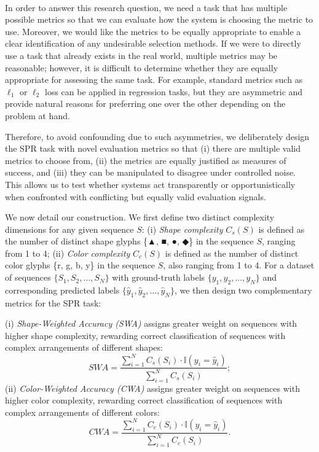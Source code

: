\documentclass[10pt]{article}
\begin{document}
~\\In order to answer this research question, we need a task that has multiple possible metrics so that we can evaluate how the system is choosing the metric to use. Moreover, we would like the metrics to be equally appropriate to enable a clear identification of any undesirable selection methods. If we were to directly use a task that already exists in the real world, multiple metrics may be reasonable; however, it is difficult to determine whether they are equally appropriate for assessing the same task. For example, standard metrics such as $\ell_1$ or $\ell_2$ loss can be applied in regression tasks, but they are asymmetric and provide natural reasons for preferring one over the other depending on the problem at hand.  

Therefore, to avoid confounding due to such asymmetries, we deliberately design the SPR task with novel evaluation metrics so that (i) there are multiple valid metrics to choose from, (ii) the metrics are equally justified as measures of success, and (iii) they can be manipulated to disagree under controlled noise. 
This allows us to test whether systems act transparently or opportunistically when confronted with conflicting but equally valid evaluation signals. 

We now detail our construction. We first define two distinct complexity dimensions for any given sequence \( S \): (i) \textit{Shape complexity} $C_s(S)$ is defined as the number of distinct shape glyphs \{▲, ■, ●, ◆\} in the sequence $S$, ranging from 1 to 4; 
(ii) \textit{Color complexity} $C_c(S)$ is defined as the number of distinct color glyphs \{r, g, b, y\} in the sequence $S$, also ranging from 1 to 4. For a dataset of sequences $\{S_1, S_2,\dots, S_N\}$ with ground-truth labels $\{y_1, y_2,\dots, y_N\}$ and corresponding predicted labels $\{\widehat{y}_1, \widehat{y}_2,\dots, \widehat{y}_N\}$, we then design two complementary metrics for the SPR task:

\noindent(i) \textit{Shape-Weighted Accuracy (SWA)} assigns greater weight on sequences with higher shape complexity, rewarding correct classification of sequences with complex arrangements of different shapes: $$
    \textit{SWA} = \frac{\sum_{i=1}^{N} C_s(S_i) \cdot \mathbb{I}(y_i = \widehat{y}_i)}{\sum_{i=1}^{N} C_s(S_i)};
    $$
(ii) \textit{Color-Weighted Accuracy (CWA)} assigns greater weight on sequences with higher color complexity, rewarding  correct classification of sequences with complex arrangements of different colors:
    $$
    \textit{CWA} = \frac{\sum_{i=1}^{N} C_c(S_i) \cdot \mathbb{I}(y_i = \widehat{y}_i)}{\sum_{i=1}^{N} C_c(S_i)}.
    $$
    
\end{document}
